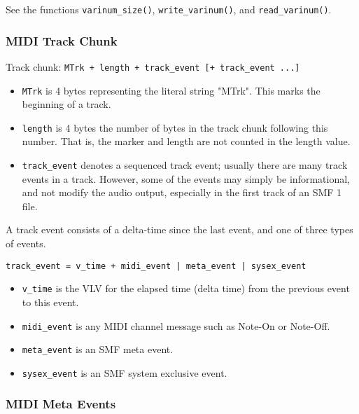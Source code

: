    See the functions
   \texttt{varinum\_size()},
   \texttt{write\_varinum()}, and
   \texttt{read\_varinum()}.

\subsubsection{MIDI Track Chunk}
\label{subsubsec:midi_track_chunk}

   Track chunk:
   \texttt{MTrk + length + track\_event [+ track\_event ...]}

   \begin{itemize}
      \item \texttt{MTrk} is 4 bytes representing the literal string "MTrk".
         This marks the beginning of a track.
      \item \texttt{length} is 4 bytes the number of bytes in the track
         chunk following this number.  That is, the marker and length are
         not counted in the length value.
      \item \texttt{track\_event} denotes a sequenced track event; usually
         there are many track events in a track.  However, some of the
         events may simply be informational, and not modify the audio
         output, especially in the first track of an SMF 1 file.
   \end{itemize}

   A track event consists of a delta-time since the last event, and one of
   three types of events.
 
   \texttt{track\_event = v\_time + midi\_event | meta\_event | sysex\_event}
 
   \begin{itemize}
      \item \texttt{v\_time} is the VLV for the elapsed time
         (delta time) from the previous event to this event.
      \item \texttt{midi\_event} is any MIDI channel message such as Note-On
         or Note-Off.
      \item \texttt{meta\_event} is an SMF meta event.
      \item \texttt{sysex\_event} is an SMF system exclusive event.
   \end{itemize}

\subsubsection{MIDI Meta Events}
\label{subsubsec:midi_meta_events}

